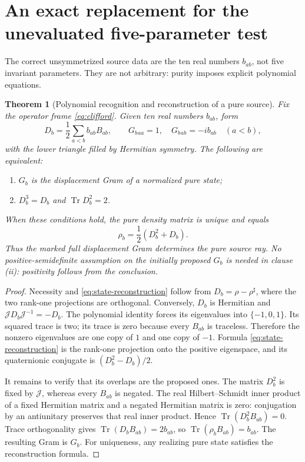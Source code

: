\documentclass[11pt]{article}
\newtheorem{theorem}{Theorem}[section]
\theoremstyle{definition}
\theoremstyle{remark}
\newcommand{\Tr}{\operatorname{Tr}}
\newcommand{\Jq}{\mathcal J}
\begin{document}
\section{An exact replacement for the unevaluated five-parameter test}
\label{sec:recognition}
The correct unsymmetrized source data are the ten real numbers $b_{ab}$,
not five invariant parameters. They are not arbitrary: purity imposes
explicit polynomial equations.

\begin{theorem}[Polynomial recognition and reconstruction of a pure source]
\label{thm:pure-recognition}
Fix the operator frame \eqref{eq:clifford}. Given ten real numbers $b_{ab}$,
form
\begin{equation}
 D_b=\frac12\sum_{a<b}b_{ab}B_{ab},\qquad
 G_b{}_{aa}=1,\quad G_b{}_{ab}=-ib_{ab}\quad(a<b),
 \label{eq:candidate-G}
\end{equation}
with the lower triangle filled by Hermitian symmetry. The following are equivalent:
\begin{enumerate}[label=\textup{(\roman*)},leftmargin=2.7em]
\item $G_b$ is the displacement Gram of a normalized pure state;
\item $D_b^3=D_b$ and $\Tr D_b^2=2$.
\end{enumerate}
When these conditions hold, the pure density matrix is unique and equals
\begin{equation}
 \boxed{\rho_b=\frac12(D_b^2+D_b).}
 \label{eq:state-reconstruction}
\end{equation}
Thus the marked full displacement Gram determines the pure source ray.
No positive-semidefinite assumption on the initially proposed $G_b$ is
needed in clause \textup{(ii)}: positivity follows from the conclusion.
\end{theorem}
\begin{proof}
Necessity and \eqref{eq:state-reconstruction} follow from
$D_b=\rho-\rho^\sharp$, where the two rank-one projections are orthogonal.
Conversely, $D_b$ is Hermitian and $\Jq D_b\Jq^{-1}=-D_b$. The polynomial
identity forces its eigenvalues into $\{-1,0,1\}$. Its squared trace is two;
its trace is zero because every $B_{ab}$ is traceless. Therefore the nonzero
eigenvalues are one copy of $1$ and one copy of $-1$. Formula
\eqref{eq:state-reconstruction} is the rank-one projection onto the positive
eigenspace, and its quaternionic conjugate is $(D_b^2-D_b)/2$.

It remains to verify that its overlaps are the proposed ones. The matrix
$D_b^2$ is fixed by $\Jq$, whereas every $B_{ab}$ is negated. The real
Hilbert--Schmidt inner product of a fixed Hermitian matrix and a negated
Hermitian matrix is zero: conjugation by an antiunitary preserves that real
inner product. Hence $\Tr(D_b^2B_{ab})=0$. Trace orthogonality gives
$\Tr(D_b B_{ab})=2b_{ab}$, so
$\Tr(\rho_bB_{ab})=b_{ab}$. The resulting Gram is $G_b$.
For uniqueness, any realizing pure state satisfies the reconstruction formula.
\end{proof}
\end{document}
